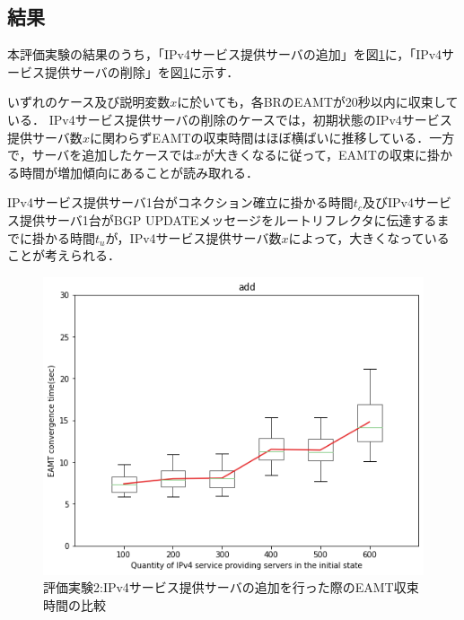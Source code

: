 \begin{table}[h]
    \label{table:eval2_condition}
    \caption{評価実験2での各ホストの情報}
\end{table}

\subsection{結果}
\label{evaluation:eval2:result}
本評価実験の結果のうち，「IPv4サービス提供サーバの追加」を図\ref{fig:eval2_result_add}に，「IPv4サービス提供サーバの削除」を図\ref{fig:eval2_result_add}に示す．

いずれのケース及び説明変数$x$に於いても，各BRのEAMTが20秒以内に収束している．
IPv4サービス提供サーバの削除のケースでは，初期状態のIPv4サービス提供サーバ数$x$に関わらずEAMTの収束時間はほぼ横ばいに推移している．一方で，サーバを追加したケースでは$x$が大きくなるに従って，EAMTの収束に掛かる時間が増加傾向にあることが読み取れる．

IPv4サービス提供サーバ1台がコネクション確立に掛かる時間$t_c$及びIPv4サービス提供サーバ1台がBGP UPDATEメッセージをルートリフレクタに伝達するまでに掛かる時間$t_u$が，IPv4サービス提供サーバ数$x$によって，大きくなっていることが考えられる．

\begin{figure}[]
    \begin{center}
    \includegraphics[width=12cm,pagebox=cropbox,clip]{img/eval2_result_add.png}
    \end{center}
    \caption{評価実験2:IPv4サービス提供サーバの追加を行った際のEAMT収束時間の比較}
    \label{fig:eval2_result_add}
\end{figure}


